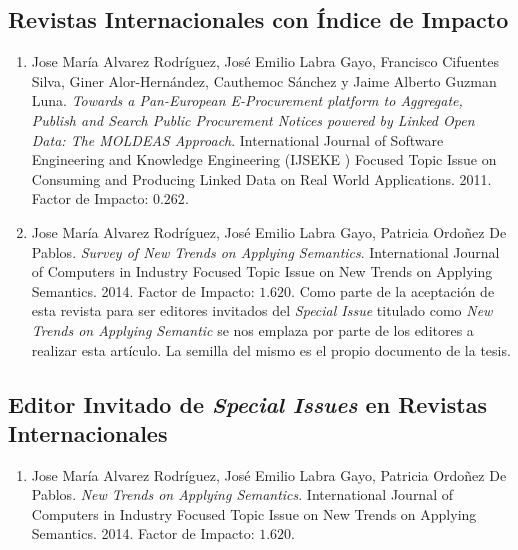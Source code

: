 \subsection{Revistas Internacionales con Índice de Impacto}

\begin{enumerate}
 \item Jose María Alvarez Rodríguez, José Emilio Labra Gayo, Francisco Cifuentes Silva, Giner Alor-Hernández, Cauthemoc Sánchez y Jaime
Alberto Guzman Luna. \textit{Towards a Pan-European E-Procurement platform to Aggregate, Publish and Search Public Procurement Notices 
powered by Linked Open Data: The MOLDEAS Approach}. International Journal of Software Engineering and Knowledge Engineering (IJSEKE ) 
Focused Topic Issue on Consuming and Producing Linked Data on Real World Applications. 2011. Factor de Impacto: $0.262$.

\item Jose María Alvarez Rodríguez, José Emilio Labra Gayo, Patricia Ordoñez De Pablos. \textit{Survey of New Trends on \eproc Applying Semantics}.
International Journal of Computers in Industry Focused Topic Issue on New Trends on \eproc Applying Semantics. 2014. Factor de Impacto: $1.620$. Como
parte de la aceptación de esta revista para ser editores invitados del \textit{Special Issue} titulado como \textit{New Trends on \eproc Applying Semantic}
se nos emplaza por parte de los editores a realizar esta artículo. La semilla del mismo es el propio documento de la tesis.

\end{enumerate}

\subsection{Editor Invitado de \textit{Special Issues} en Revistas Internacionales}

\begin{enumerate}
\item Jose María Alvarez Rodríguez, José Emilio Labra Gayo, Patricia Ordoñez De Pablos. \textit{New Trends on \eproc Applying Semantics}.
International Journal of Computers in Industry Focused Topic Issue on New Trends on \eproc Applying Semantics. 2014. Factor de Impacto: $1.620$.
\end{enumerate}

